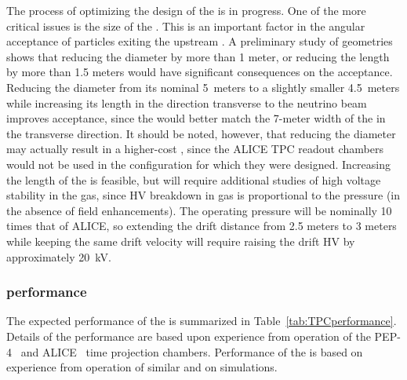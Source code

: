     
 The process of optimizing the design of the  is in progress. One of the more critical issues is the size of the .  This is an important factor in the angular acceptance of particles exiting the upstream . A preliminary study of geometries shows that reducing the  diameter by more than 1 meter, or reducing the length by more than 1.5 meters would have significant consequences on the acceptance. Reducing the  diameter from its nominal 5~meters to a slightly smaller 4.5~meters while increasing its length in the direction transverse to the neutrino beam improves acceptance, since the  would better match the 7-meter width of the  in the transverse direction. It should be noted, however, that reducing the diameter may actually result in a higher-cost , since the ALICE TPC readout chambers would not be used in the configuration for which they were designed. Increasing the length of the  is feasible, but will require additional studies of high voltage stability in the gas, since HV breakdown in gas is proportional to the pressure (in the absence of field enhancements).  The  operating pressure will be nominally 10 times that of ALICE, so extending the drift distance from 2.5 meters to 3 meters while keeping the same drift velocity will require raising the drift HV by approximately 20~kV.



\subsubsection{ performance}
The expected performance of the  is summarized in Table~\ref{tab:TPCperformance}. Details of the  performance are based upon experience from operation of the PEP-4~\cite{PEP4_results_Layter,PEP4_Stork,Madaras:1982cj} and ALICE~\cite{Alessandro:2006yt} time projection chambers. Performance of the  is based on experience from operation of similar  and on simulations. 

